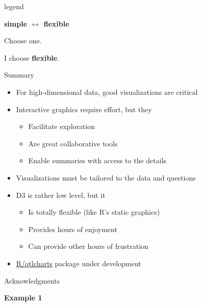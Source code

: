 \documentclass[final,plain]{beamer}
\newlength{\onecolwid}
\newcommand{\bi}{\begin{itemize}}
\newcommand{\ei}{\end{itemize}}
\newcommand{\bluebold}{\color{dblue} \bf}
\newcommand{\coltwovsep}{\vspace{40mm}}
\newcommand{\hilit}{\color{mypurple}}
\begin{document}
\begin{frame}[t]
\begin{columns}[t]
\begin{column}{\onecolwid}
  \coltwovsep %

        \begin{beamercolorbox}[sep=1em, wd=\onecolwid]{legend} \rmfamily

          \centerline{\bluebold \Large simple \quad
            $\longleftrightarrow$ \quad flexible}

           \vspace{48pt}

           \hfill \begin{minipage}{0.3\onecolwid}
            Choose one.

            I choose {\bluebold flexible}.
            \end{minipage}

        \end{beamercolorbox}

  \coltwovsep %

    \begin{exampleblock}{\Large Summary}
        \bi \itemsep18pt
        \item For high-dimensional data, good visualizations are
          {\hilit critical}
        \item {\hilit Interactive} graphics require effort, but they
          \bi
          \item Facilitate exploration
          \item Are great collaborative tools
          \item Enable summaries with access to the details
          \ei
        \item Visualizations must be {\hilit tailored} to
          the data and questions
        \item {\hilit D3} is rather low level, but it
          \bi
          \item Is totally flexible (like R's static graphics)
          \item Provides hours of enjoyment
          \item Can provide other hours of frustration
          \ei
        \item \href{http://github.com/kbroman/qtlcharts}{R/qtlcharts} package under development
        \ei
    \end{exampleblock}

  \coltwovsep %

    \begin{block}{Acknowledgments}

      {\bluebold Example 1}


\end{block}
\end{column}
\end{columns}
\end{frame}
\end{document}

